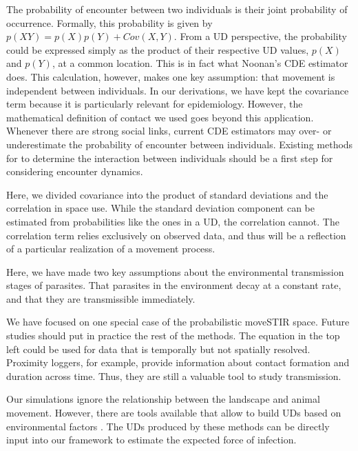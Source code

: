 \documentclass[letterpaper]{article}
\begin{document}


The probability of encounter between two individuals is their joint probability of occurrence.  Formally, this probability is given by $p(XY)=p(X)p(Y)+Cov(X,Y)$. From a UD perspective, the probability could be expressed simply as the product of their respective UD values, $p(X)$ and $p(Y)$, at a common location. %
This is in fact what Noonan's CDE estimator does. This calculation, however, makes one key assumption: that movement is independent between individuals. 
In our derivations, we have kept the covariance term because it is particularly relevant for epidemiology. However, the mathematical definition of contact we used goes beyond this application.  Whenever there are strong social links, current CDE estimators may over- or underestimate the probability of encounter between individuals. 
Existing methods for to determine the interaction between individuals \citep{Scharf2018} should be a first step for considering encounter dynamics. 

Here, we divided covariance into the product of standard deviations and the correlation in space use. While the standard deviation component can be estimated from probabilities like the ones in a UD, the correlation cannot. The correlation term relies exclusively on observed data, and thus will be a reflection of a particular realization of a movement process. 

Here, we have made two key assumptions about the environmental transmission stages of parasites. That parasites in the environment decay at a constant rate, and that they are transmissible immediately. 


We have focused on one special case of the probabilistic moveSTIR space. Future studies should put in practice the rest of the methods. The equation in the top left could be used for data that is temporally but not spatially resolved. Proximity loggers, for example, provide information about contact formation and duration across time. Thus, they are still a valuable tool to study transmission.

Our simulations ignore the relationship between the landscape and animal movement. However, there are tools available that allow to build UDs based on environmental factors \citep{Signer2017,Michelot2020}. The UDs produced by these methods can be directly input into our framework to estimate the expected force of infection.
\end{document}

